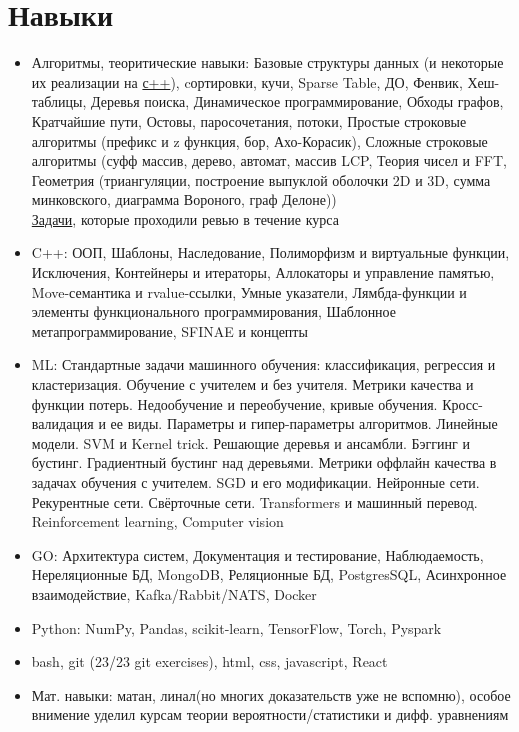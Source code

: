 \documentclass[a4paper,10pt]{article}
\begin{document}
\section*{Навыки}
\noindent
\begin{itemize}[noitemsep]
    \item Алгоритмы, теоритические навыки: Базовые структуры данных (и некоторые их реализации на \href{https://github.com/grgtr/MIPT-CPP}{с++}), cортировки, кучи, Sparse Table, ДО, Фенвик, Хеш-таблицы, Деревья поиска, Динамическое программирование, Обходы графов, Кратчайшие пути, Остовы, паросочетания, потоки, Простые строковые алгоритмы (префикс и z функция, бор, Ахо-Корасик), Сложные строковые алгоритмы (суфф массив, дерево, автомат, массив LCP, Теория чисел и FFT, Геометрия (триангуляции, построение выпуклой оболочки 2D и 3D, сумма минковского, диаграмма Вороного, граф Делоне)) \\
    \href{https://gitlab.com/grgtr}{Задачи}, которые проходили ревью в течение курса
    \item C++: ООП, Шаблоны, Наследование, Полиморфизм и виртуальные функции, Исключения, Контейнеры и итераторы, Аллокаторы и управление памятью, Move-семантика и rvalue-ссылки, Умные указатели, Лямбда-функции и элементы функционального программирования, Шаблонное метапрограммирование, SFINAE и концепты
    \item ML: Стандартные задачи машинного обучения: классификация, регрессия и кластеризация. Обучение с учителем и без учителя. Метрики качества и функции потерь. Недообучение и переобучение, кривые обучения. Кросс-валидация и ее виды. Параметры и гипер-параметры алгоритмов.
    Линейные модели.
    SVM и Kernel trick.
    Решающие деревья и ансамбли.
    Бэггинг и бустинг.
    Градиентный бустинг над деревьями.
    Метрики оффлайн качества в задачах обучения с учителем.
    SGD и его модификации.
    Нейронные сети.
    Рекурентные сети.
    Свёрточные сети.
    Transformers и машинный перевод.
    Reinforcement learning, Computer vision
    \item GO: Архитектура систем, Документация и тестирование, Наблюдаемость, Нереляционные БД, MongoDB, Реляционные БД, PostgresSQL, Асинхронное взаимодействие, Kafka/Rabbit/NATS, Docker
    \item Python: NumPy, Pandas, scikit-learn, TensorFlow, Torch, Pyspark
    \item bash, git (23/23 git exercises), html, css, javascript, React
    \item Мат. навыки: матан, линал(но многих доказательств уже не вспомню), особое внимение уделил курсам теории вероятности/статистики и дифф. уравнениям
\end{itemize}
\end{document}
